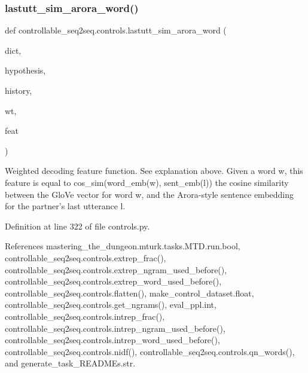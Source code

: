 \subsubsection{\texorpdfstring{lastutt\+\_\+sim\+\_\+arora\+\_\+word()}{lastutt\_sim\_arora\_word()}}
{\footnotesize\ttfamily def controllable\+\_\+seq2seq.\+controls.\+lastutt\+\_\+sim\+\_\+arora\+\_\+word (\begin{DoxyParamCaption}\item[{}]{dict,  }\item[{}]{hypothesis,  }\item[{}]{history,  }\item[{}]{wt,  }\item[{}]{feat }\end{DoxyParamCaption})}

\begin{DoxyVerb}Weighted decoding feature function. See explanation above.
Given a word w, this feature is equal to
  cos_sim(word_emb(w), sent_emb(l))
the cosine similarity between the GloVe vector for word w, and the Arora-style
sentence embedding for the partner's last utterance l.
\end{DoxyVerb}
 

Definition at line 322 of file controls.\+py.



References mastering\+\_\+the\+\_\+dungeon.\+mturk.\+tasks.\+M\+T\+D.\+run.\+bool, controllable\+\_\+seq2seq.\+controls.\+extrep\+\_\+frac(), controllable\+\_\+seq2seq.\+controls.\+extrep\+\_\+ngram\+\_\+used\+\_\+before(), controllable\+\_\+seq2seq.\+controls.\+extrep\+\_\+word\+\_\+used\+\_\+before(), controllable\+\_\+seq2seq.\+controls.\+flatten(), make\+\_\+control\+\_\+dataset.\+float, controllable\+\_\+seq2seq.\+controls.\+get\+\_\+ngrams(), eval\+\_\+ppl.\+int, controllable\+\_\+seq2seq.\+controls.\+intrep\+\_\+frac(), controllable\+\_\+seq2seq.\+controls.\+intrep\+\_\+ngram\+\_\+used\+\_\+before(), controllable\+\_\+seq2seq.\+controls.\+intrep\+\_\+word\+\_\+used\+\_\+before(), controllable\+\_\+seq2seq.\+controls.\+nidf(), controllable\+\_\+seq2seq.\+controls.\+qn\+\_\+words(), and generate\+\_\+task\+\_\+\+R\+E\+A\+D\+M\+Es.\+str.


